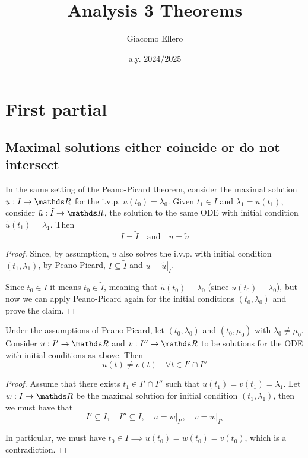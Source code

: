 \documentclass[12pt]{extarticle}
\title{Analysis 3 Theorems}
\author{Giacomo Ellero}
\date{a.y. 2024/2025}
\numberwithin{equation}{section}
\begin{document}
\section{First partial}

\subsection{Maximal solutions either coincide or do not intersect}

\begin{theorem}{}{}
	In the same setting of the Peano-Picard theorem,
	consider the maximal solution $u: I \to \R$
	for the i.v.p. $u(t_0) = \lambda_0$.
	Given $t_1 \in I$ and $\lambda_1 = u(t_1)$,
	consider $\tilde{u}: \tilde I \to \R$,
	the solution to the same ODE with initial condition $\tilde{u}(t_1) = \lambda_1$.
	Then
	\begin{equation}
		I = \tilde I \quad \text{and} \quad u = \tilde u
	\end{equation}
\end{theorem}

\begin{proof}
	Since, by assumption, $u$ also solves the i.v.p. with initial condition $(t_1, \lambda_1)$,
	by Peano-Picard, $I \subseteq \tilde I$ and $u = \left. \tilde u \right|_I$.

	Since $t_0 \in I$ it means $t_0 \in \tilde I$, meaning that $\tilde u(t_0) = \lambda_0$
	(since $u(t_0) = \lambda_0$), but now we can apply Peano-Picard again for the initial conditions $(t_0, \lambda_0)$
	and prove the claim.
\end{proof}


\begin{theorem}{}{}
	Under the assumptions of Peano-Picard, let $(t_0, \lambda_0)$ and $(t_0, \mu_0)$ with $\lambda_0 \ne \mu_0$.
	Consider $u: I' \to \R$ and $v: I'' \to \R$ to be solutions for the ODE with initial conditions as above.
	Then
	\begin{equation}
		u(t) \neq v(t) \quad \forall t \in I' \cap I''
	\end{equation}
\end{theorem}

\begin{proof}
	Assume that there exists $t_1 \in I' \cap I''$ such that $u(t_1) = v(t_1) = \lambda_1$.
	Let $w: I \to \R$ be the maximal solution for initial condition $(t_1, \lambda_1)$,
	then we must have that
	\begin{equation}
		I'\subseteq I, \quad I'' \subseteq I, \quad u = \left. w\right|_{I'}, \quad v = \left. w\right|_{I''}
	\end{equation}

	In particular, we must have $t_0 \in I \implies u(t_0) = w(t_0) = v(t_0)$, which is a contradiction.
\end{proof}
\end{document}
